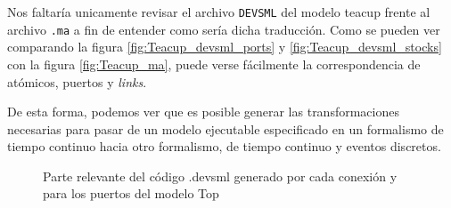 Nos faltaría unicamente revisar el archivo \texttt{DEVSML} del modelo teacup frente al archivo \texttt{.ma} a fin de entender como sería dicha traducción. Como se pueden ver comparando la figura \ref{fig:Teacup_devsml_ports} y \ref{fig:Teacup_devsml_stocks} con la figura \ref{fig:Teacup_ma}, puede verse fácilmente la correspondencia de atómicos, puertos y \textit{links}.

De esta forma, podemos ver que es posible generar las transformaciones necesarias para pasar de un modelo ejecutable especificado en un formalismo de tiempo continuo hacia otro formalismo, de tiempo continuo y eventos discretos.

\begin{figure}[!h]
	\centering     %
	\caption{Parte relevante del código .devsml generado por cada conexión y para los puertos del modelo Top}
\end{figure}

